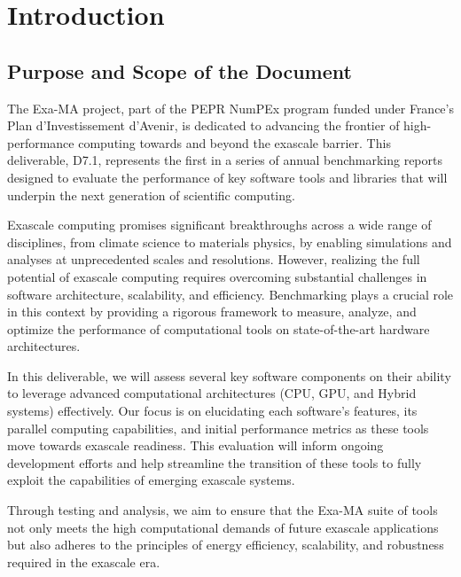 
\clearpage
\section{Introduction}
\label{sec:introduction}


\subsection{Purpose and Scope of the Document}
\label{sec:purpose}

The Exa-MA project, part of the PEPR NumPEx program funded under France’s Plan d’Investissement d’Avenir, is dedicated to advancing the frontier of high-performance computing towards and beyond the exascale barrier.
This deliverable, D7.1, represents the first in a series of annual benchmarking reports designed to evaluate the performance of key software tools and libraries that will underpin the next generation of scientific computing.

Exascale computing promises significant breakthroughs across a wide range of disciplines, from climate science to materials physics, by enabling simulations and analyses at unprecedented scales and resolutions.
However, realizing the full potential of exascale computing requires overcoming substantial challenges in software architecture, scalability, and efficiency.
Benchmarking plays a crucial role in this context by providing a rigorous framework to measure, analyze, and optimize the performance of computational tools on state-of-the-art hardware architectures.

In this deliverable, we will assess several key software components on their ability to leverage advanced computational architectures (CPU, GPU, and Hybrid systems) effectively.
Our focus is on elucidating each software’s features, its parallel computing capabilities, and initial performance metrics as these tools move towards exascale readiness.
This evaluation will inform ongoing development efforts and help streamline the transition of these tools to fully exploit the capabilities of emerging exascale systems.

Through testing and analysis, we aim to ensure that the Exa-MA suite of tools not only meets the high computational demands of future exascale applications but also adheres to the principles of energy efficiency, scalability, and robustness required in the exascale era.



